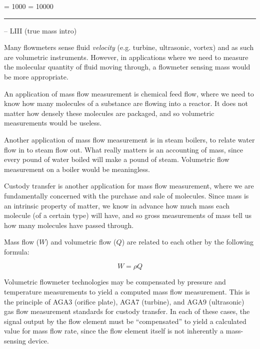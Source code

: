 



\tolerance = 1000
\pretolerance = 10000

\vskip 5pt \hrule \vskip 5pt  -- LIII (true mass intro) \vskip 10pt

Many flowmeters sense fluid {\it velocity} (e.g. turbine, ultrasonic, vortex) and as such are volumetric instruments.  However, in applications where we need to measure the molecular quantity of fluid moving through, a flowmeter sensing mass would be more appropriate.

\vskip 10pt

An application of mass flow measurement is chemical feed flow, where we need to know how many molecules of a substance are flowing into a reactor.  It does not matter how densely these molecules are packaged, and so volumetric measurements would be useless.

Another application of mass flow measurement is in steam boilers, to relate water flow in to steam flow out.  What really matters is an accounting of mass, since every pound of water boiled will make a pound of steam.  Volumetric flow measurement on a boiler would be meaningless.

Custody transfer is another application for mass flow measurement, where we are fundamentally concerned with the purchase and sale of molecules.  Since mass is an intrinsic property of matter, we know in advance how much mass each molecule (of a certain type) will have, and so gross measurements of mass tell us how many molecules have passed through.

\vskip 10pt

Mass flow ($W$) and volumetric flow ($Q$) are related to each other by the following formula:

$$W = \rho Q$$

\vskip 10pt

Volumetric flowmeter technologies may be compensated by pressure and temperature measurements to yield a computed mass flow measurement.  This is the principle of AGA3 (orifice plate), AGA7 (turbine), and AGA9 (ultrasonic) gas flow measurement standards for custody transfer.  In each of these cases, the signal output by the flow element must be ``compensated'' to yield a calculated value for mass flow rate, since the flow element itself is not inherently a mass-sensing device.

